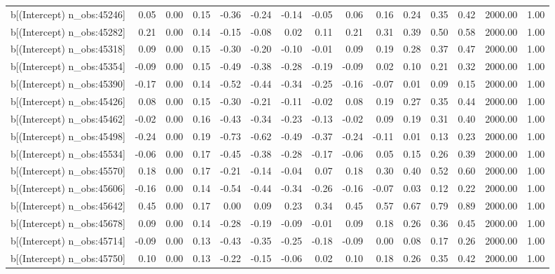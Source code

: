 \begin{table}[ht]
\begin{tabular}{rrrrrrrrrrrrrrr}
  b[(Intercept) n\_obs:45246] & 0.05 & 0.00 & 0.15 & -0.36 & -0.24 & -0.14 & -0.05 & 0.06 & 0.16 & 0.24 & 0.35 & 0.42 & 2000.00 & 1.00 \\ 
  b[(Intercept) n\_obs:45282] & 0.21 & 0.00 & 0.14 & -0.15 & -0.08 & 0.02 & 0.11 & 0.21 & 0.31 & 0.39 & 0.50 & 0.58 & 2000.00 & 1.00 \\ 
  b[(Intercept) n\_obs:45318] & 0.09 & 0.00 & 0.15 & -0.30 & -0.20 & -0.10 & -0.01 & 0.09 & 0.19 & 0.28 & 0.37 & 0.47 & 2000.00 & 1.00 \\ 
  b[(Intercept) n\_obs:45354] & -0.09 & 0.00 & 0.15 & -0.49 & -0.38 & -0.28 & -0.19 & -0.09 & 0.02 & 0.10 & 0.21 & 0.32 & 2000.00 & 1.00 \\ 
  b[(Intercept) n\_obs:45390] & -0.17 & 0.00 & 0.14 & -0.52 & -0.44 & -0.34 & -0.25 & -0.16 & -0.07 & 0.01 & 0.09 & 0.15 & 2000.00 & 1.00 \\ 
  b[(Intercept) n\_obs:45426] & 0.08 & 0.00 & 0.15 & -0.30 & -0.21 & -0.11 & -0.02 & 0.08 & 0.19 & 0.27 & 0.35 & 0.44 & 2000.00 & 1.00 \\ 
  b[(Intercept) n\_obs:45462] & -0.02 & 0.00 & 0.16 & -0.43 & -0.34 & -0.23 & -0.13 & -0.02 & 0.09 & 0.19 & 0.31 & 0.40 & 2000.00 & 1.00 \\ 
  b[(Intercept) n\_obs:45498] & -0.24 & 0.00 & 0.19 & -0.73 & -0.62 & -0.49 & -0.37 & -0.24 & -0.11 & 0.01 & 0.13 & 0.23 & 2000.00 & 1.00 \\ 
  b[(Intercept) n\_obs:45534] & -0.06 & 0.00 & 0.17 & -0.45 & -0.38 & -0.28 & -0.17 & -0.06 & 0.05 & 0.15 & 0.26 & 0.39 & 2000.00 & 1.00 \\ 
  b[(Intercept) n\_obs:45570] & 0.18 & 0.00 & 0.17 & -0.21 & -0.14 & -0.04 & 0.07 & 0.18 & 0.30 & 0.40 & 0.52 & 0.60 & 2000.00 & 1.00 \\ 
  b[(Intercept) n\_obs:45606] & -0.16 & 0.00 & 0.14 & -0.54 & -0.44 & -0.34 & -0.26 & -0.16 & -0.07 & 0.03 & 0.12 & 0.22 & 2000.00 & 1.00 \\ 
  b[(Intercept) n\_obs:45642] & 0.45 & 0.00 & 0.17 & 0.00 & 0.09 & 0.23 & 0.34 & 0.45 & 0.57 & 0.67 & 0.79 & 0.89 & 2000.00 & 1.00 \\ 
  b[(Intercept) n\_obs:45678] & 0.09 & 0.00 & 0.14 & -0.28 & -0.19 & -0.09 & -0.01 & 0.09 & 0.18 & 0.26 & 0.36 & 0.45 & 2000.00 & 1.00 \\ 
  b[(Intercept) n\_obs:45714] & -0.09 & 0.00 & 0.13 & -0.43 & -0.35 & -0.25 & -0.18 & -0.09 & 0.00 & 0.08 & 0.17 & 0.26 & 2000.00 & 1.00 \\ 
  b[(Intercept) n\_obs:45750] & 0.10 & 0.00 & 0.13 & -0.22 & -0.15 & -0.06 & 0.02 & 0.10 & 0.18 & 0.26 & 0.35 & 0.42 & 2000.00 & 1.00 \\ 

\end{tabular}
\end{table}
